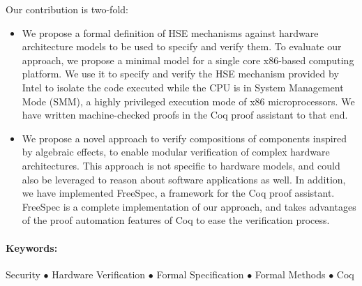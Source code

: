Our contribution is two-fold:
%
\begin{itemize}
\item We propose a formal definition of HSE mechanisms against hardware
  architecture models to be used to specify and verify them.
  To evaluate our approach, we propose a minimal model for a single core
  x86-based computing platform.
  We use it to specify and verify the HSE mechanism provided by Intel to isolate
  the code executed while the CPU is in System Management Mode (SMM), a highly
  privileged execution mode of x86 microprocessors.
  We have written machine-checked proofs in the Coq proof assistant to that
  end.
\item We propose a novel approach to verify compositions of components inspired
  by algebraic effects, to enable modular verification of complex hardware
  architectures.
  This approach is not specific to hardware models, and could also be leveraged
  to reason about software applications as well.
  In addition, we have implemented FreeSpec, a framework for the Coq proof
  assistant.
  FreeSpec is a complete implementation of our approach, and takes advantages of
  the proof automation features of Coq to ease the verification process.
\end{itemize}

\paragraph{Keywords:}
%
Security $\bullet$ Hardware Verification $\bullet$ Formal Specification
$\bullet$ Formal Methods $\bullet$ Coq
